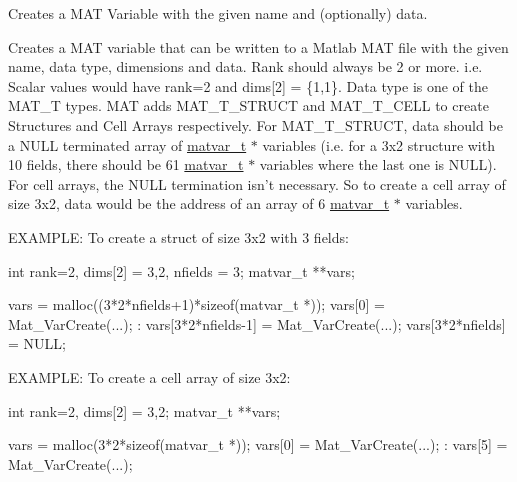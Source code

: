 \-Creates a \-M\-A\-T \-Variable with the given name and (optionally) data. 

\-Creates a \-M\-A\-T variable that can be written to a \-Matlab \-M\-A\-T file with the given name, data type, dimensions and data. \-Rank should always be 2 or more. i.\-e. \-Scalar values would have rank=2 and dims\mbox{[}2\mbox{]} = \{1,1\}. \-Data type is one of the \-M\-A\-T\-\_\-\-T types. \-M\-A\-T adds \-M\-A\-T\-\_\-\-T\-\_\-\-S\-T\-R\-U\-C\-T and \-M\-A\-T\-\_\-\-T\-\_\-\-C\-E\-L\-L to create \-Structures and \-Cell \-Arrays respectively. \-For \-M\-A\-T\-\_\-\-T\-\_\-\-S\-T\-R\-U\-C\-T, data should be a \-N\-U\-L\-L terminated array of \hyperlink{structmatvar__t}{matvar\-\_\-t} $\ast$ variables (i.\-e. for a 3x2 structure with 10 fields, there should be 61 \hyperlink{structmatvar__t}{matvar\-\_\-t} $\ast$ variables where the last one is \-N\-U\-L\-L). \-For cell arrays, the \-N\-U\-L\-L termination isn't necessary. \-So to create a cell array of size 3x2, data would be the address of an array of 6 \hyperlink{structmatvar__t}{matvar\-\_\-t} $\ast$ variables.

\-E\-X\-A\-M\-P\-L\-E\-: \-To create a struct of size 3x2 with 3 fields\-: 
\begin{DoxyCode}
     int rank=2, dims[2] = {3,2}, nfields = 3;
     matvar_t **vars;

     vars = malloc((3*2*nfields+1)*sizeof(matvar_t *));
     vars[0]             = Mat_VarCreate(...);
        :
     vars[3*2*nfields-1] = Mat_VarCreate(...);
     vars[3*2*nfields]   = NULL;
\end{DoxyCode}


\-E\-X\-A\-M\-P\-L\-E\-: \-To create a cell array of size 3x2\-: 
\begin{DoxyCode}
     int rank=2, dims[2] = {3,2};
     matvar_t **vars;

     vars = malloc(3*2*sizeof(matvar_t *));
     vars[0]             = Mat_VarCreate(...);
        :
     vars[5] = Mat_VarCreate(...);
\end{DoxyCode}



